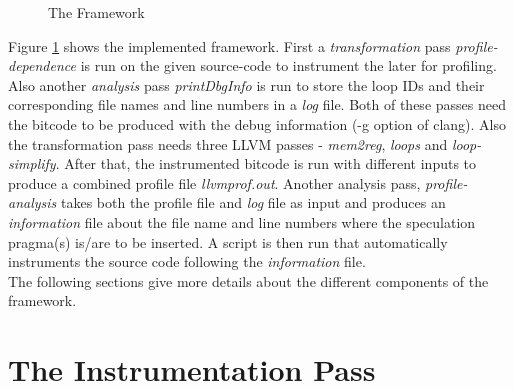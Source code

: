 \documentclass[10pt]{report}          %
\begin{document}
\begin{figure}[ht]
\begin{center}
\renewcommand{\figure}{Fig.}
\caption{ The Framework}
\end{center}
\label{fig:framework}
\end{figure}

Figure \ref{fig:framework} shows the implemented framework.  First a \textit{transformation} pass \textit{profile-dependence} is run on the given source-code to instrument the later for profiling.  Also another \textit{analysis} pass \textit{printDbgInfo} is run to store the loop IDs and their corresponding file names and line numbers in a \textit{log} file.  Both of these passes need the bitcode to be produced with the debug information (-g option of clang).  Also the transformation pass needs three LLVM passes - \textit{mem2reg}, \textit{loops} and \textit{loop-simplify}.  After that, the instrumented bitcode is run with different inputs to produce a combined profile file \textit{llvmprof.out}.  Another analysis pass, \textit{profile-analysis} takes both the profile file and \textit{log} file as input and produces an \textit{information} file about the file name and line numbers where the speculation pragma(s) is/are to be inserted.  A script is then run that automatically instruments the source code following the \textit{information} file. \\

The following sections give more details about the different components of the framework.


\section{The Instrumentation Pass}
\end{document}
